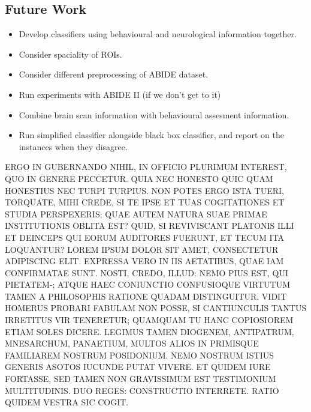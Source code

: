 \documentclass[letterpaper]{article}
\begin{document}
\subsection{Future Work}
\begin{itemize}
    \item Develop classifiers using behavioural and neurological information together.
    \item Consider spaciality of ROIs.
    \item Consider different preprocessing of ABIDE dataset.
    \item Run experiments with ABIDE II (if we don't get to it)
    \item Combine brain scan information with behavioural assesment information.
    \item Run simplified classifier alongside black box classifier, and report on the instances when they disagree.
\end{itemize}


ERGO IN GUBERNANDO NIHIL, IN OFFICIO PLURIMUM INTEREST, QUO IN GENERE PECCETUR. QUIA NEC HONESTO QUIC QUAM HONESTIUS NEC TURPI TURPIUS. NON POTES ERGO ISTA TUERI, TORQUATE, MIHI CREDE, SI TE IPSE ET TUAS COGITATIONES ET STUDIA PERSPEXERIS; QUAE AUTEM NATURA SUAE PRIMAE INSTITUTIONIS OBLITA EST? QUID, SI REVIVISCANT PLATONIS ILLI ET DEINCEPS QUI EORUM AUDITORES FUERUNT, ET TECUM ITA LOQUANTUR?
LOREM IPSUM DOLOR SIT AMET, CONSECTETUR ADIPISCING ELIT. EXPRESSA VERO IN IIS AETATIBUS, QUAE IAM CONFIRMATAE SUNT. NOSTI, CREDO, ILLUD: NEMO PIUS EST, QUI PIETATEM-; ATQUE HAEC CONIUNCTIO CONFUSIOQUE VIRTUTUM TAMEN A PHILOSOPHIS RATIONE QUADAM DISTINGUITUR. VIDIT HOMERUS PROBARI FABULAM NON POSSE, SI CANTIUNCULIS TANTUS IRRETITUS VIR TENERETUR; QUAMQUAM TU HANC COPIOSIOREM ETIAM SOLES DICERE. LEGIMUS TAMEN DIOGENEM, ANTIPATRUM, MNESARCHUM, PANAETIUM, MULTOS ALIOS IN PRIMISQUE FAMILIAREM NOSTRUM POSIDONIUM. NEMO NOSTRUM ISTIUS GENERIS ASOTOS IUCUNDE PUTAT VIVERE. ET QUIDEM IURE FORTASSE, SED TAMEN NON GRAVISSIMUM EST TESTIMONIUM MULTITUDINIS. DUO REGES: CONSTRUCTIO INTERRETE. RATIO QUIDEM VESTRA SIC COGIT.

\appendix


\end{document}
